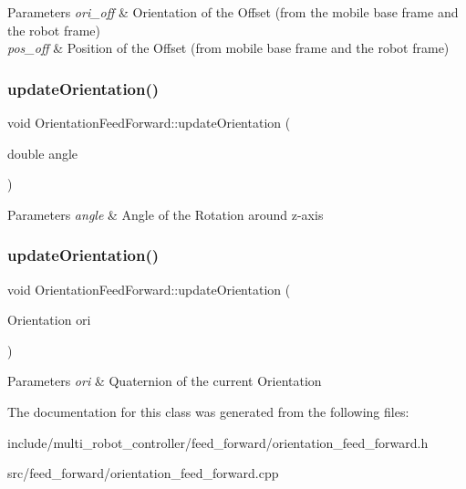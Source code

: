 \begin{DoxyParams}{Parameters}
{\em ori\+\_\+off} & Orientation of the Offset (from the mobile base frame and the robot frame) \\
\hline
{\em pos\+\_\+off} & Position of the Offset (from mobile base frame and the robot frame) \\
\hline
\end{DoxyParams}
\mbox{\label{classOrientationFeedForward_aa7d8913f8f9d90e913b478d9adc5ff20}} 
\subsubsection{\texorpdfstring{update\+Orientation()}{updateOrientation()}\hspace{0.1cm}{\footnotesize\ttfamily [1/2]}}
{\footnotesize\ttfamily void Orientation\+Feed\+Forward\+::update\+Orientation (\begin{DoxyParamCaption}\item[{double}]{angle }\end{DoxyParamCaption})}


\begin{DoxyParams}{Parameters}
{\em angle} & Angle of the Rotation around z-\/axis \\
\hline
\end{DoxyParams}
\mbox{\label{classOrientationFeedForward_aed8f826976135c0cd55408a652993828}} 
\subsubsection{\texorpdfstring{update\+Orientation()}{updateOrientation()}\hspace{0.1cm}{\footnotesize\ttfamily [2/2]}}
{\footnotesize\ttfamily void Orientation\+Feed\+Forward\+::update\+Orientation (\begin{DoxyParamCaption}\item[{Orientation}]{ori }\end{DoxyParamCaption})}


\begin{DoxyParams}{Parameters}
{\em ori} & Quaternion of the current Orientation \\
\hline
\end{DoxyParams}


The documentation for this class was generated from the following files\+:\begin{DoxyCompactItemize}
\item 
include/multi\+\_\+robot\+\_\+controller/feed\+\_\+forward/orientation\+\_\+feed\+\_\+forward.\+h\item 
src/feed\+\_\+forward/orientation\+\_\+feed\+\_\+forward.\+cpp\end{DoxyCompactItemize}
